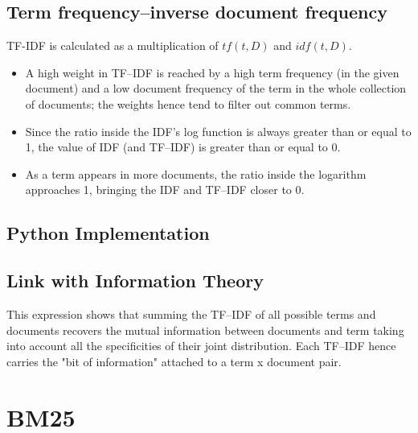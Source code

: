 \subsection{Term frequency–inverse document frequency}
TF-IDF is calculated as a multiplication of $tf(t, D)$ and $idf(t, D)$. 
\begin{itemize}
	\item A high weight in TF–IDF is reached by a high term frequency (in the given document) and a low document frequency of the term in the whole collection of documents; the weights hence tend to filter out common terms. 
	\item Since the ratio inside the IDF's log function is always greater than or equal to 1, the value of IDF (and TF–IDF) is greater than or equal to 0. 
	\item As a term appears in more documents, the ratio inside the logarithm approaches 1, bringing the IDF and TF–IDF closer to 0. 
\end{itemize}


\subsection{Python Implementation}



\subsection{Link with Information Theory}
This expression shows that summing the TF–IDF of all possible terms and documents recovers the mutual information between documents and term taking into account all the specificities of their joint distribution. Each TF–IDF hence carries the "bit of information" attached to a term x document pair. 


\section{BM25}
\label{sec:nlp_bm25}










